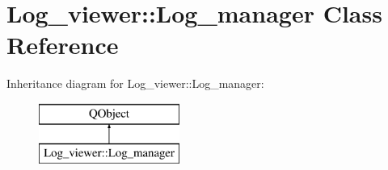 \hypertarget{class_log__viewer_1_1_log__manager}{\section{Log\-\_\-viewer\-:\-:Log\-\_\-manager Class Reference}
\label{class_log__viewer_1_1_log__manager}
}
Inheritance diagram for Log\-\_\-viewer\-:\-:Log\-\_\-manager\-:\begin{figure}[H]
\begin{center}
\leavevmode
\includegraphics[height=2.000000cm]{class_log__viewer_1_1_log__manager}
\end{center}
\end{figure}
